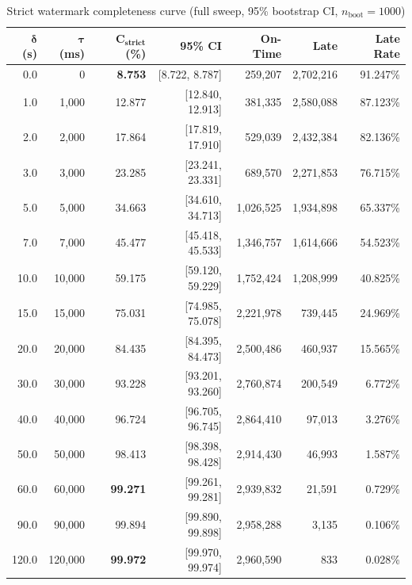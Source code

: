 \documentclass[11pt,a4paper]{article}
\begin{document}
\begin{table}[H]
\centering
\caption{Strict watermark completeness curve (full sweep, 95\% bootstrap CI, $n_{\text{boot}}{=}1000$)}
\label{tab:strict-sweep}
\footnotesize
\begin{tabular}{rrrrrrr}
\toprule
$\bm{\delta}$ \textbf{(s)} & $\bm{\tau}$ \textbf{(ms)} & $\mathbf{C_{\textbf{strict}}}$ \textbf{(\%)} & \textbf{95\% CI} & \textbf{On-Time} & \textbf{Late} & \textbf{Late Rate} \\
\midrule
0.0   & 0        & \textbf{8.753}  & [8.722, 8.787] & 259,207   & 2,702,216 & 91.247\% \\
1.0   & 1,000    & 12.877           & [12.840, 12.913] & 381,335 & 2,580,088 & 87.123\% \\
2.0   & 2,000    & 17.864           & [17.819, 17.910] & 529,039 & 2,432,384 & 82.136\% \\
3.0   & 3,000    & 23.285           & [23.241, 23.331] & 689,570 & 2,271,853 & 76.715\% \\
5.0   & 5,000    & 34.663           & [34.610, 34.713] & 1,026,525 & 1,934,898 & 65.337\% \\
7.0   & 7,000    & 45.477           & [45.418, 45.533] & 1,346,757 & 1,614,666 & 54.523\% \\
10.0  & 10,000   & 59.175           & [59.120, 59.229] & 1,752,424 & 1,208,999 & 40.825\% \\
15.0  & 15,000   & 75.031           & [74.985, 75.078] & 2,221,978 & 739,445   & 24.969\% \\
20.0  & 20,000   & 84.435           & [84.395, 84.473] & 2,500,486 & 460,937   & 15.565\% \\
30.0  & 30,000   & 93.228           & [93.201, 93.260] & 2,760,874 & 200,549   & 6.772\% \\
40.0  & 40,000   & 96.724           & [96.705, 96.745] & 2,864,410 & 97,013    & 3.276\% \\
50.0  & 50,000   & 98.413           & [98.398, 98.428] & 2,914,430 & 46,993    & 1.587\% \\
60.0  & 60,000   & \textbf{99.271}  & [99.261, 99.281] & 2,939,832 & 21,591    & 0.729\% \\
90.0  & 90,000   & 99.894           & [99.890, 99.898] & 2,958,288 & 3,135     & 0.106\% \\
120.0 & 120,000  & \textbf{99.972}  & [99.970, 99.974] & 2,960,590 & 833       & 0.028\% \\
\bottomrule
\end{tabular}
\end{table}
\end{document}
